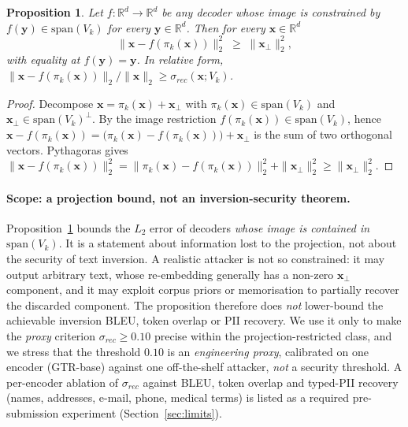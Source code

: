 \documentclass[11pt,a4paper]{article}
\newtheorem{proposition}{Proposition}
\begin{document}
\begin{proposition}\label{lemma:proj-l2}
Let $f : \mathbb{R}^d \to \mathbb{R}^d$ be any decoder whose image is
constrained by $f(\mathbf{y}) \in \mathrm{span}(V_k)$ for every
$\mathbf{y} \in \mathbb{R}^d$. Then for every
$\mathbf{x} \in \mathbb{R}^d$
\[
\| \mathbf{x} - f(\pi_k(\mathbf{x})) \|_2^{2}
\;\geq\; \| \mathbf{x}_\perp \|_2^{2},
\]
with equality at $f(\mathbf{y}) = \mathbf{y}$. In relative form,
$\| \mathbf{x} - f(\pi_k(\mathbf{x})) \|_2 / \|\mathbf{x}\|_2
\geq \sigma_{rec}(\mathbf{x}; V_k)$.
\end{proposition}

\begin{proof}
Decompose $\mathbf{x} = \pi_k(\mathbf{x}) + \mathbf{x}_\perp$ with
$\pi_k(\mathbf{x}) \in \mathrm{span}(V_k)$ and
$\mathbf{x}_\perp \in \mathrm{span}(V_k)^\perp$. By the image
restriction $f(\pi_k(\mathbf{x})) \in \mathrm{span}(V_k)$, hence
$\mathbf{x} - f(\pi_k(\mathbf{x})) =
\bigl( \pi_k(\mathbf{x}) - f(\pi_k(\mathbf{x})) \bigr) + \mathbf{x}_\perp$
is the sum of two orthogonal vectors. Pythagoras gives
$\| \mathbf{x} - f(\pi_k(\mathbf{x})) \|_2^{2}
= \| \pi_k(\mathbf{x}) - f(\pi_k(\mathbf{x})) \|_2^{2}
+ \| \mathbf{x}_\perp \|_2^{2}
\geq \| \mathbf{x}_\perp \|_2^{2}$.
\end{proof}

\paragraph{Scope: a projection bound, not an inversion-security
theorem.} Proposition~\ref{lemma:proj-l2} bounds the $L_2$ error of
decoders \emph{whose image is contained in} $\mathrm{span}(V_k)$. It is a
statement about information lost to the projection, not about the
security of text inversion. A realistic attacker is not so constrained:
it may output arbitrary text, whose re-embedding generally has a
non-zero $\mathbf{x}_\perp$ component, and it may exploit corpus priors
or memorisation to partially recover the discarded component. The
proposition therefore does \emph{not} lower-bound the achievable inversion BLEU,
token overlap or PII recovery. We use it only to make the
\emph{proxy} criterion $\sigma_{rec} \geq 0.10$ precise within the
projection-restricted class, and we stress that the threshold $0.10$ is
an \emph{engineering proxy}, calibrated on one encoder (GTR-base) against
one off-the-shelf attacker, \emph{not} a security threshold. A
per-encoder ablation of $\sigma_{rec}$ against BLEU, token overlap and
typed-PII recovery (names, addresses, e-mail, phone, medical terms) is
listed as a required pre-submission experiment
(Section~\ref{sec:limits}).
\end{document}
